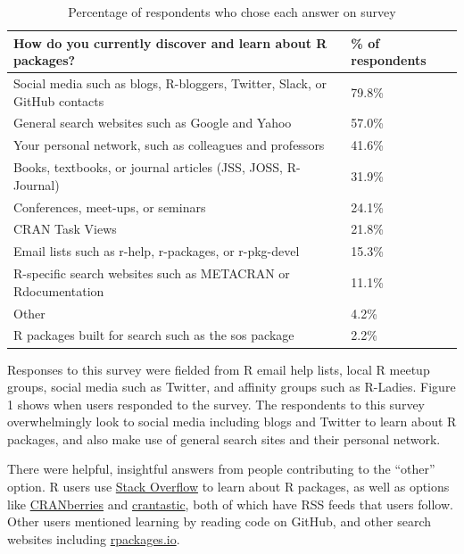 \begin{Schunk}
\begin{table}

\caption{\label{tab:unnamed-chunk-2}Percentage of respondents who chose each answer on survey}
\centering
\begin{tabular}[t]{ll}
\toprule
How do you currently discover and learn about R packages? & \% of respondents\\
\midrule
Social media such as blogs, R-bloggers, Twitter, Slack, or GitHub contacts & 79.8\%\\
General search websites such as Google and Yahoo & 57.0\%\\
Your personal network, such as colleagues and professors & 41.6\%\\
Books, textbooks, or journal articles (JSS, JOSS, R-Journal) & 31.9\%\\
Conferences, meet-ups, or seminars & 24.1\%\\
\addlinespace
CRAN Task Views & 21.8\%\\
Email lists such as r-help, r-packages, or r-pkg-devel & 15.3\%\\
R-specific search websites such as METACRAN or Rdocumentation & 11.1\%\\
Other & 4.2\%\\
R packages built for search such as the sos package & 2.2\%\\
\bottomrule
\end{tabular}
\end{table}

\end{Schunk}

Responses to this survey were fielded from R email help lists, local R
meetup groups, social media such as Twitter, and affinity groups such as
R-Ladies. Figure 1 shows when users responded to the survey. The
respondents to this survey overwhelmingly look to social media including
blogs and Twitter to learn about R packages, and also make use of
general search sites and their personal network.

There were helpful, insightful answers from people contributing to the
``other'' option. R users use
\href{https://stackoverflow.com/questions/tagged/r}{Stack Overflow} to
learn about R packages, as well as options like
\href{http://dirk.eddelbuettel.com/cranberries/}{CRANberries} and
\href{http://www.crantastic.org/}{crantastic}, both of which have RSS
feeds that users follow. Other users mentioned learning by reading code
on GitHub, and other search websites including
\href{http://rpackages.io/}{rpackages.io}.

